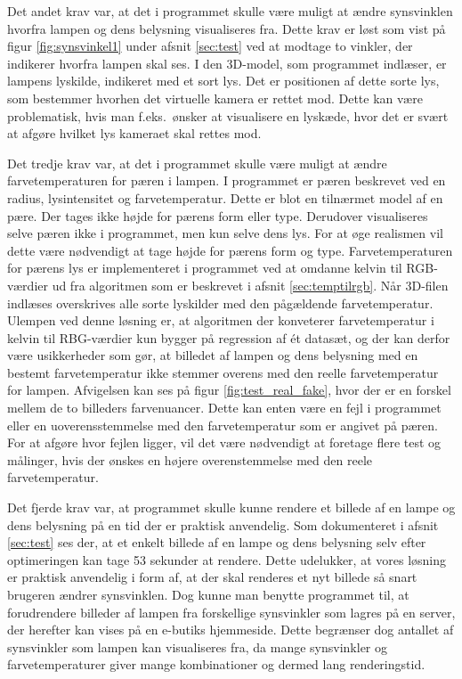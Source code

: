 Det andet krav var, at det i programmet skulle være muligt at ændre synsvinklen hvorfra lampen og dens belysning visualiseres fra. Dette krav er løst som vist på figur \ref{fig:synsvinkel1} under afsnit \ref{sec:test} ved at modtage to vinkler, der indikerer hvorfra lampen skal ses. I den 3D-model, som programmet indlæser, er lampens lyskilde, indikeret med et sort lys. Det er positionen af dette sorte lys, som bestemmer hvorhen det virtuelle kamera er rettet mod. Dette kan være problematisk, hvis man f.eks.\ ønsker at visualisere en lyskæde, hvor det er svært at afgøre hvilket lys kameraet skal rettes mod. 

Det tredje krav var, at det i programmet skulle være muligt at ændre farvetemperaturen for pæren i lampen. I programmet er pæren beskrevet ved en radius, lysintensitet og farvetemperatur. Dette er blot en tilnærmet model af en pære. Der tages ikke højde for pærens form eller type. Derudover visualiseres selve pæren ikke i programmet, men kun selve dens lys. For at øge realismen vil dette være nødvendigt at tage højde for pærens form og type.
Farvetemperaturen for pærens lys er implementeret i programmet ved at omdanne kelvin til RGB-værdier ud fra algoritmen som er beskrevet i afsnit \ref{sec:temptilrgb}. Når 3D-filen indlæses overskrives alle sorte lyskilder med den pågældende farvetemperatur. Ulempen ved denne løsning er, at algoritmen der konveterer farvetemperatur i kelvin til RBG-værdier kun bygger på regression af ét datasæt, og der kan derfor være usikkerheder som gør, at billedet af lampen og dens belysning med en bestemt farvetemperatur ikke stemmer overens med den reelle farvetemperatur for lampen. Afvigelsen kan ses på figur \ref{fig:test_real_fake}, hvor der er en forskel mellem de to billeders farvenuancer. Dette kan enten være en fejl i programmet eller en uoverensstemmelse med den farvetemperatur som er angivet på pæren. For at afgøre hvor fejlen ligger, vil det være nødvendigt at foretage flere test og målinger, hvis der ønskes en højere overenstemmelse med den reele farvetemperatur.

Det fjerde krav var, at programmet skulle kunne rendere et billede af en lampe og dens belysning på en tid der er praktisk anvendelig. Som dokumenteret i afsnit \ref{sec:test} ses der, at et enkelt billede af en lampe og dens belysning selv efter optimeringen kan tage 53 sekunder at rendere. Dette udelukker, at vores løsning er praktisk anvendelig i form af, at der skal renderes et nyt billede så snart brugeren ændrer synsvinklen. Dog kunne man benytte programmet til, at forudrendere billeder af lampen fra forskellige synsvinkler som lagres på en server, der herefter kan vises på en e-butiks hjemmeside. Dette begrænser dog antallet af synsvinkler som lampen kan visualiseres fra, da mange synsvinkler og farvetemperaturer giver mange kombinationer og dermed lang renderingstid. 

